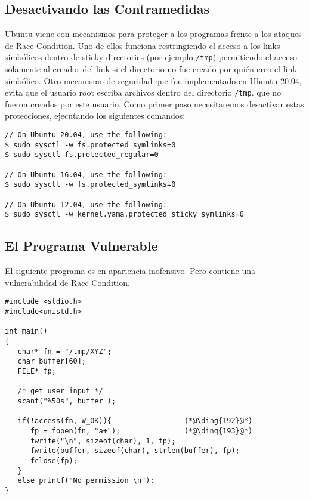 \subsection{Desactivando las Contramedidas}

Ubuntu viene con mecanismos para proteger a los programas frente a los ataques de Race Condition. Uno de ellos funciona restringiendo el acceso a los links simbólicos dentro de  sticky directories (por ejemplo {\tt /tmp}) permitiendo el acceso solamente al creador del link si el directorio no fue creado por quién creo el link simbólico.
Otro mecanismo de seguridad que fue implementado en Ubuntu 20.04, evita que el usuario root escriba archivos  dentro del directorio \texttt{/tmp}. que no fueron creados por este usuario.
Como primer paso necesitaremos desactivar estas protecciones, ejecutando los siguientes comandos:

\begin{lstlisting}
// On Ubuntu 20.04, use the following:
$ sudo sysctl -w fs.protected_symlinks=0
$ sudo sysctl fs.protected_regular=0

// On Ubuntu 16.04, use the following:
$ sudo sysctl -w fs.protected_symlinks=0

// On Ubuntu 12.04, use the following:
$ sudo sysctl -w kernel.yama.protected_sticky_symlinks=0
\end{lstlisting}


\subsection{El Programa Vulnerable}

El siguiente programa es en apariencia inofensivo. Pero contiene una vulnerabilidad de Race Condition.

\begin{lstlisting}[caption={The vulnerable program (\texttt{vulp.c})}]
#include <stdio.h>
#include<unistd.h>

int main()
{
   char* fn = "/tmp/XYZ";
   char buffer[60];
   FILE* fp;

   /* get user input */
   scanf("%50s", buffer );

   if(!access(fn, W_OK)){                 (*@\ding{192}@*)
      fp = fopen(fn, "a+");               (*@\ding{193}@*)
      fwrite("\n", sizeof(char), 1, fp);
      fwrite(buffer, sizeof(char), strlen(buffer), fp);
      fclose(fp);
   }
   else printf("No permission \n");
}
\end{lstlisting}

